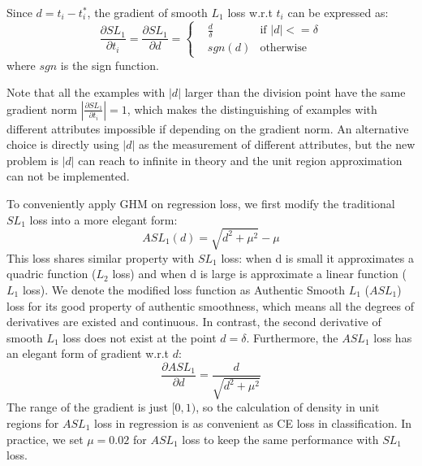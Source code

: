 \documentclass[letterpaper]{article} %
\begin{document}
Since $d = t_i - t_i^*$, the gradient of smooth $L_1$ loss w.r.t $t_i$ can be expressed as:
\begin{equation}
\label{eq:g_smoothl1}
    \frac{\partial SL_1}{\partial t_i} = \frac{\partial SL_1}{\partial d} = \left\{ 
    \begin{aligned}
        & \frac{d}{\delta} & \text{if }  |d| <= \delta \\
        & sgn(d) & \text{otherwise}
    \end{aligned}
    \right.
\end{equation}
where $sgn$ is the sign function. 

Note that all the examples with $|d|$ larger than the division point have the same gradient norm $|\frac{\partial SL_1}{\partial t_i}| = 1$, which makes the distinguishing of examples with different attributes impossible if depending on the gradient norm. An alternative choice is directly using $|d|$ as the measurement of different attributes, but the new problem is $|d|$ can reach to infinite in theory and the unit region approximation can not be implemented.

To conveniently apply  GHM on regression loss, we first modify the traditional $SL_1$ loss into a more elegant form:
\begin{equation}
\label{eq:asl1}
    ASL_1(d) = \sqrt{d^2 + \mu^2} - \mu
\end{equation}
This loss shares similar property with $SL_1$ loss: when d is small it approximates a quadric function ($L_2$ loss) and when d is large is approximate a linear function ($L_1$ loss). We denote the modified loss function as Authentic Smooth $L_1$ ($ASL_1$) loss for its good property of authentic smoothness, which means all the degrees of derivatives are existed and continuous. In contrast, the second derivative of smooth $L_1$ loss does not exist at the point $d = \delta$. Furthermore, the $ASL_1$ loss has an elegant form of gradient w.r.t $d$:
\begin{equation}
\label{eq:g_asl1}
    \frac{\partial ASL_1}{\partial d} = \frac{d}{\sqrt{d^2 + \mu^2}}
\end{equation}
The range of the gradient is just $[0,1)$, so the calculation of density in unit regions for $ASL_1$ loss in regression is as convenient as CE loss in classification. In practice, we set $\mu = 0.02$ for $ASL_1$ loss to keep the same performance with $SL_1$ loss.
\end{document}
